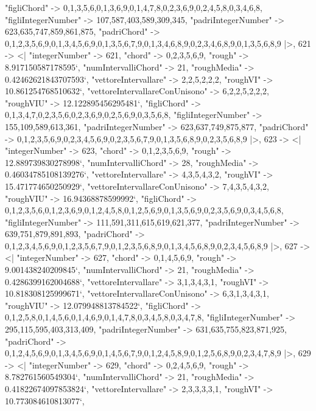 \documentclass[
]{article}
\begin{document}
\begin{DatasetVerbatim}
    "figliChord" -> {{0,1,3,5,6},{0,1,3,6,9},{0,1,4,7,8},{0,2,3,6,9},{0,2,4,5,8},{0,3,4,6,8}},
    "figliIntegerNumber" -> {107,587,403,589,309,345},
    "padriIntegerNumber" -> {623,635,747,859,861,875},
    "padriChord" -> {{0,1,2,3,5,6,9},{0,1,3,4,5,6,9},{0,1,3,5,6,7,9},{0,1,3,4,6,8,9},{0,2,3,4,6,8,9},{0,1,3,5,6,8,9}}
  |>,
  621 -> <|
    "integerNumber" -> 621,
    "chord" -> {0,2,3,5,6,9},
    "rough" -> 8.917150587178595`,
    "numIntervalliChord" -> 21,
    "roughMedia" -> 0.42462621843707593`,
    "vettoreIntervallare" -> {2,2,5,2,2,2},
    "roughVI" -> 10.861254768510632`,
    "vettoreIntervallareConUnisono" -> {6,2,2,5,2,2,2},
    "roughVIU" -> 12.122895456295481`,
    "figliChord" -> {{0,1,3,4,7},{0,2,3,5,6},{0,2,3,6,9},{0,2,5,6,9},{0,3,5,6,8}},
    "figliIntegerNumber" -> {155,109,589,613,361},
    "padriIntegerNumber" -> {623,637,749,875,877},
    "padriChord" -> {{0,1,2,3,5,6,9},{0,2,3,4,5,6,9},{0,2,3,5,6,7,9},{0,1,3,5,6,8,9},{0,2,3,5,6,8,9}}
  |>,
  623 -> <|
    "integerNumber" -> 623,
    "chord" -> {0,1,2,3,5,6,9},
    "rough" -> 12.889739830278998`,
    "numIntervalliChord" -> 28,
    "roughMedia" -> 0.46034785108139276`,
    "vettoreIntervallare" -> {4,3,5,4,3,2},
    "roughVI" -> 15.471774650250929`,
    "vettoreIntervallareConUnisono" -> {7,4,3,5,4,3,2},
    "roughVIU" -> 16.94368878599992`,
    "figliChord" -> {{0,1,2,3,5,6},{0,1,2,3,6,9},{0,1,2,4,5,8},{0,1,2,5,6,9},{0,1,3,5,6,9},{0,2,3,5,6,9},{0,3,4,5,6,8}},
    "figliIntegerNumber" -> {111,591,311,615,619,621,377},
    "padriIntegerNumber" -> {639,751,879,891,893},
    "padriChord" -> {{0,1,2,3,4,5,6,9},{0,1,2,3,5,6,7,9},{0,1,2,3,5,6,8,9},{0,1,3,4,5,6,8,9},{0,2,3,4,5,6,8,9}}
  |>,
  627 -> <|
    "integerNumber" -> 627,
    "chord" -> {0,1,4,5,6,9},
    "rough" -> 9.001438240209845`,
    "numIntervalliChord" -> 21,
    "roughMedia" -> 0.4286399162004688`,
    "vettoreIntervallare" -> {3,1,3,4,3,1},
    "roughVI" -> 10.818308125999671`,
    "vettoreIntervallareConUnisono" -> {6,3,1,3,4,3,1},
    "roughVIU" -> 12.079948813784522`,
    "figliChord" -> {{0,1,2,5,8},{0,1,4,5,6},{0,1,4,6,9},{0,1,4,7,8},{0,3,4,5,8},{0,3,4,7,8}},
    "figliIntegerNumber" -> {295,115,595,403,313,409},
    "padriIntegerNumber" -> {631,635,755,823,871,925},
    "padriChord" -> {{0,1,2,4,5,6,9},{0,1,3,4,5,6,9},{0,1,4,5,6,7,9},{0,1,2,4,5,8,9},{0,1,2,5,6,8,9},{0,2,3,4,7,8,9}}
  |>,
  629 -> <|
    "integerNumber" -> 629,
    "chord" -> {0,2,4,5,6,9},
    "rough" -> 8.782761560549304`,
    "numIntervalliChord" -> 21,
    "roughMedia" -> 0.41822674097853824`,
    "vettoreIntervallare" -> {2,3,3,3,3,1},
    "roughVI" -> 10.773084610813077`,

\end{DatasetVerbatim}
\end{document}
